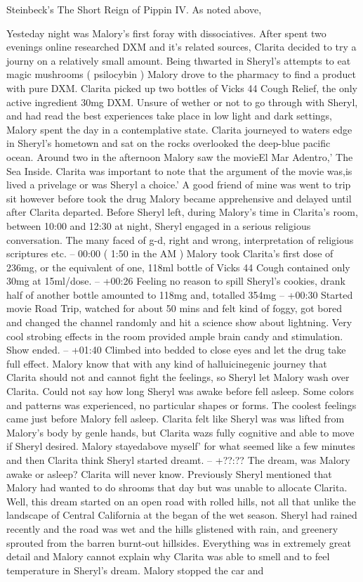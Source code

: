 \documentclass[12pt]{book}
\begin{document}
Steinbeck's The Short Reign of Pippin IV. As noted above,



Yesteday night was Malory's first foray with dissociatives. After spent two evenings online researched DXM and it's related sources, Clarita decided to try a journy on a relatively small amount. Being thwarted in Sheryl's attempts to eat magic mushrooms ( psilocybin ) Malory drove to the pharmacy to find a product with pure DXM. Clarita picked up two bottles of Vicks 44 Cough Relief, the only active ingredient 30mg DXM. Unsure of wether or not to go through with Sheryl, and had read the best experiences take place in low light and dark settings, Malory spent the day in a contemplative state. Clarita journeyed to waters edge in Sheryl's hometown and sat on the rocks overlooked the deep-blue pacific ocean. Around two in the afternoon Malory saw the movieEl Mar Adentro,' The Sea Inside. Clarita was important to note that the argument of the movie was,is lived a privelage or was Sheryl a choice.' A good friend of mine was went to trip sit however before took the drug Malory became apprehensive and delayed until after Clarita departed. Before Sheryl left, during Malory's time in Clarita's room, between 10:00 and 12:30 at night, Sheryl engaged in a serious religious conversation. The many faced of g-d, right and wrong, interpretation of religious scriptures etc. -- 00:00 ( 1:50 in the AM ) Malory took Clarita's first dose of 236mg, or the equivalent of one, 118ml bottle of Vicks 44 Cough contained only 30mg at 15ml/dose. -- +00:26 Feeling no reason to spill Sheryl's cookies, drank half of another bottle amounted to 118mg and, totalled 354mg -- +00:30 Started movie Road Trip, watched for about 50 mins and felt kind of foggy, got bored and changed the channel randomly and hit a science show about lightning. Very cool strobing effects in the room provided ample brain candy and stimulation. Show ended. -- +01:40 Climbed into bedded to close eyes and let the drug take full effect. Malory know that with any kind of halluicinegenic journey that Clarita should not and cannot fight the feelings, so Sheryl let Malory wash over Clarita. Could not say how long Sheryl was awake before fell asleep. Some colors and patterns was experienced, no particular shapes or forms. The coolest feelings came just before Malory fell asleep. Clarita felt like Sheryl was was lifted from Malory's body by genle hands, but Clarita wazs fully cognitive and able to move if Sheryl desired. Malory stayedabove myself' for what seemed like a few minutes and then Clarita think Sheryl started dreamt. -- +??:?? The dream, was Malory awake or asleep? Clarita will never know. Previously Sheryl mentioned that Malory had wanted to do shrooms that day but was unable to allocate Clarita. Well, this dream started on an open road with rolled hills, not all that unlike the landscape of Central California at the began of the wet season. Sheryl had rained recently and the road was wet and the hills glistened with rain, and greenery sprouted from the barren burnt-out hillsides. Everything was in extremely great detail and Malory cannot explain why Clarita was able to smell and to feel temperature in Sheryl's dream. Malory stopped the car and 
\end{document}
